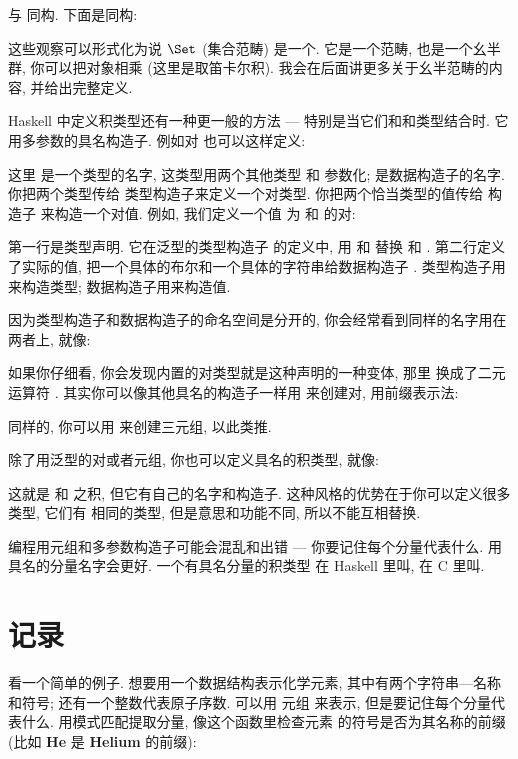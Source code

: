 与  同构. 下面是同构:


这些观察可以形式化为说 $\Set$ (集合范畴) 是一个. 它是一个范畴,
也是一个幺半群, 你可以把对象相乘 (这里是取笛卡尔积). 我会在后面讲更多关于幺半范畴的内容, 并给出完整定义.

Haskell 中定义积类型还有一种更一般的方法 --- 特别是当它们和和类型结合时. 它用多参数的具名构造子. 例如对
也可以这样定义:

这里  是一个类型的名字, 这类型用两个其他类型  和  参数化; 
是数据构造子的名字. 你把两个类型传给  类型构造子来定义一个对类型. 你把两个恰当类型的值传给
构造子  来构造一个对值. 例如, 我们定义一个值  为  和  的对:

第一行是类型声明. 它在泛型的类型构造子  的定义中, 用  和  替换  和
. 第二行定义了实际的值, 把一个具体的布尔和一个具体的字符串给数据构造子 . 类型构造子用来构造类型;
数据构造子用来构造值.

因为类型构造子和数据构造子的命名空间是分开的, 你会经常看到同样的名字用在两者上, 就像:

如果你仔细看, 你会发现内置的对类型就是这种声明的一种变体, 那里  换成了二元运算符 \code{(,)}.
其实你可以像其他具名的构造子一样用 \code{(,)} 来创建对, 用前缀表示法:

同样的, 你可以用 \code{(,,)} 来创建三元组, 以此类推.

除了用泛型的对或者元组, 你也可以定义具名的积类型, 就像:

这就是  和  之积, 但它有自己的名字和构造子. 这种风格的优势在于你可以定义很多类型, 它们有
相同的类型, 但是意思和功能不同, 所以不能互相替换.

编程用元组和多参数构造子可能会混乱和出错 --- 你要记住每个分量代表什么. 用具名的分量名字会更好. 一个有具名分量的积类型
在 Haskell 里叫, 在 C 里叫.

\section{记录}

看一个简单的例子. 想要用一个数据结构表示化学元素, 其中有两个字符串---名称和符号; 还有一个整数代表原子序数. 可以用
元组  来表示, 但是要记住每个分量代表什么. 用模式匹配提取分量, 像这个函数里检查元素
的符号是否为其名称的前缀(比如 \textbf{He} 是 \textbf{Helium} 的前缀):

